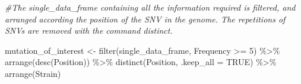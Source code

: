 \documentclass[
]{article}
\newenvironment{Shaded}{\begin{snugshade}}{\end{snugshade}}
\newcommand{\AttributeTok}[1]{\textcolor[rgb]{0.77,0.63,0.00}{#1}}
\newcommand{\CommentTok}[1]{\textcolor[rgb]{0.56,0.35,0.01}{\textit{#1}}}
\newcommand{\ConstantTok}[1]{\textcolor[rgb]{0.00,0.00,0.00}{#1}}
\newcommand{\DecValTok}[1]{\textcolor[rgb]{0.00,0.00,0.81}{#1}}
\newcommand{\FunctionTok}[1]{\textcolor[rgb]{0.00,0.00,0.00}{#1}}
\newcommand{\NormalTok}[1]{#1}
\newcommand{\OtherTok}[1]{\textcolor[rgb]{0.56,0.35,0.01}{#1}}
\newcommand{\SpecialCharTok}[1]{\textcolor[rgb]{0.00,0.00,0.00}{#1}}
\begin{document}
\begin{Shaded}
\begin{Highlighting}[]
\CommentTok{\#The single\_data\_frame containing all the information required is filtered, and arranged according the position of the SNV in the genome. The repetitions of SNVs are removed with the command distinct.}

\NormalTok{mutation\_of\_interest }\OtherTok{\textless{}{-}} \FunctionTok{filter}\NormalTok{(single\_data\_frame, Frequency }\SpecialCharTok{\textgreater{}=} \DecValTok{5}\NormalTok{) }\SpecialCharTok{\%\textgreater{}\%}
  \FunctionTok{arrange}\NormalTok{(}\FunctionTok{desc}\NormalTok{(Position)) }\SpecialCharTok{\%\textgreater{}\%}
  \FunctionTok{distinct}\NormalTok{(Position, }\AttributeTok{.keep\_all =} \ConstantTok{TRUE}\NormalTok{) }\SpecialCharTok{\%\textgreater{}\%}
  \FunctionTok{arrange}\NormalTok{(Strain)}


\end{Highlighting}
\end{Shaded}
\end{document}
